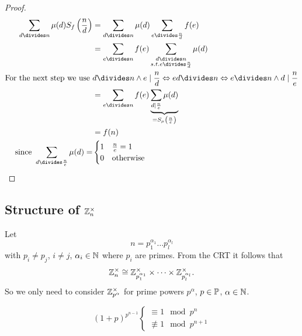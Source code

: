 \documentclass[NumTh.tex]{subfiles}
\begin{document}
\begin{proof}
  \begin{align*}
    \sum_{d\divides n} \mu(d) S_f\left(\frac{n}{d}\right)
      &= \sum_{d\divides n} \mu(d) \sum_{e\divides \frac{n}{d}} f(e) \\
      &= \sum_{e\divides n} f(e) \sum_{\substack{d\divides n \\ s.t. e\divides \frac{n}{d}}} \mu(d) \\
      \text{For the next step we use }
		    &d \divides n \land e \mid \frac{n}{d}
		    \Leftrightarrow e d \divides n
		    \Leftrightarrow e\divides n \land d \mid \frac{n}{e}\\
      &= \sum_{e\divides n} f(e) \underbrace{\sum_{d \mid \frac{n}{e}} \mu(d)}_{= S_\mu \left(\frac{n}{e} \right)}\\
      &= f(n)\\
      \text{since }
        \sum_{d\divides  \frac{n}{e}} \mu(d) =
		&\begin{cases}
		  1 & \frac{n}{e} = 1 \\
		  0 & \text{otherwise}
		\end{cases}
  \end{align*}
\end{proof}


\subsection{Structure of $\mathbb{Z}_n^\times$}
Let
\[ n = p_1^{\alpha_1} \dots p_l^{\alpha_l} \]
with $p_i \neq p_j$, $i \neq j$, $\alpha_i \in \mathbb{N}$ where $p_i$ are primes.
From the CRT it follows that
\[ \mathbb{Z}_n^\times \cong \mathbb{Z}_{p_1^{\alpha_1}}^\times \times \dots \times \mathbb{Z}_{p_l^{\alpha_l}}^\times \text{.} \]
So we only need to consider $\mathbb{Z}_{p^\alpha}^\times$ for prime powers $p^\alpha$, $p \in \mathbb{P}$, $\alpha \in \mathbb{N}$.

\begin{lemma}\label{l_0_5_1}
  \[ (1+p)^{p^{n-1}}
    \begin{cases}
      \equiv 1 \mod p^n \\
      \nequiv 1 \mod p^{n+1}
  \end{cases} \]
\end{lemma}
\end{document}
